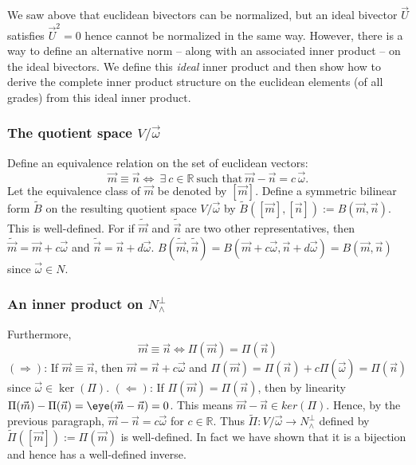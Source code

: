 \documentclass[12pt]{article}
\newcommand{\vsp}{V\xspace}
\begin{document}
We saw above that euclidean bivectors can be normalized, but an ideal bivector $\vec{U}$ satisfies $\vec{U}^{2}=0$ hence cannot be normalized in the same way.  However, there is a way to define an alternative norm -- along with an associated inner product -- on the ideal bivectors.  We define this \emph{ideal} inner product and then  show how to derive the  complete inner product structure on the euclidean elements (of all grades) from this ideal inner product.  %

\subsubsection{The quotient space $\vsp/\vec{\omega}$}
Define an equivalence relation on the set of  euclidean vectors: \[\vec{m} \equiv \vec{n} \iff~\exists~ c \in \mathbb{R}~\text{such that}~\vec{m} - \vec{n} = c\,\vec{\omega}.\]  Let the equivalence class of $\vec{m}$ be denoted by $[\vec{m}]$.   Define a symmetric bilinear form $\widetilde{B}$ on the resulting quotient space $\vsp/\vec{\omega}$ by $\widetilde{B}( [\vec{m}], [\vec{n}]) := B( \vec{m}, \vec{n})$.  This is well-defined.  For if $\widetilde{\vec{m}}$ and $\widetilde{\vec{n}}$ are two other representatives, then $\widetilde{\vec{m}} = \vec{m} + c\vec{\omega}$ and  $\widetilde{\vec{n}} = \vec{n} + d\vec{\omega}$.  $B(\widetilde{ \vec{m}}, \widetilde{\vec{n}}) = B(\vec{m} + c\vec{\omega}, \vec{n} + d\vec{\omega}) = B(\vec{m}, \vec{n})$ since $\vec{\omega} \in N$.  

\subsubsection{An  inner product on $N^{\perp}_{\wedge}$}

Furthermore,  \[\vec{m} \equiv \vec{n} \iff \Pi(\vec{m}) = \Pi(\vec{n})\] $(\Rightarrow)$: If $\vec{m} \equiv \vec{n}$,  then $\vec{m} = \vec{n} + c\vec{\omega}$ and $\Pi(\vec{m}) = \Pi(\vec{n}) + c\Pi(\vec{\omega}) = \Pi(\vec{n})$ since $\vec{\omega} \in \ker(\Pi)$.  $(\Leftarrow)$: If $\Pi(\vec{m}) = \Pi(\vec{n})$, then by linearity $\Pi(\vec{m}) -\Pi(\vec{n}) = \eye(\vec{m} - \vec{n}) =  0$.  This means $\vec{m} - \vec{n} \in ker(\Pi)$.  Hence, by the  previous paragraph, $\vec{m} - \vec{n} = c\vec{\omega}$ for $c \in \mathbb{R}$. Thus $\widetilde{\Pi} : \vsp/\vec{\omega} \rightarrow N_{\wedge}^{\perp}$ defined by $\widetilde{\Pi}([\vec{m}]) := \Pi(\vec{m})$ is well-defined.  In fact we have shown that it is a bijection and hence has a well-defined inverse.
\end{document}
